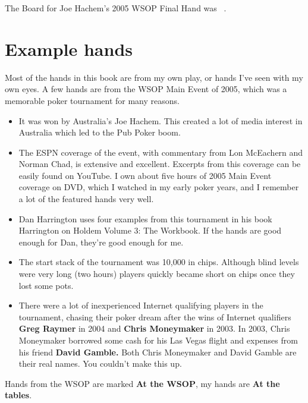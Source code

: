 The Board for Joe Hachem's 2005 WSOP Final Hand was
\sixh\fived\fourd\As\fourc\ .

\section*{Example hands}

Most of the hands in this book are from my own play, or hands I've
seen with my own eyes. A few hands are from the WSOP Main Event
of 2005, which was a memorable poker tournament for many reasons.

\begin{itemize}
  \item It was won by Australia's Joe Hachem. This created a lot of
    media interest in Australia which led to the Pub Poker boom.
  \item The ESPN coverage of the event, with commentary from
    Lon McEachern and Norman Chad, is extensive and
    excellent. Excerpts from this coverage can be easily found on
    YouTube. I own about five hours of 2005 Main Event coverage on
    DVD, which I watched in my early poker years, and I remember a lot
    of the featured hands very well.
  \item Dan Harrington uses four examples from this tournament in his
    book Harrington on Holdem Volume 3: The Workbook. If the hands are
    good enough for Dan, they're good enough for me.
  \item The start stack of the tournament was 10,000 in
    chips. Although blind levels were very long (two hours)
    players quickly became short on chips once they lost some pots.
  \item There were a lot of inexperienced Internet qualifying players
    in the tournament, chasing their poker dream after the wins of
    Internet qualifiers \textbf{Greg Raymer} in 2004 and \textbf{Chris
    Moneymaker} in 2003. In 2003, Chris Moneymaker
    borrowed some cash for his Las Vegas flight and expenses from his
    friend \textbf{David Gamble.} Both Chris Moneymaker and David Gamble are
    their real names. You couldn't make this up.

\end{itemize}

Hands from the WSOP are marked \textbf{At the WSOP}, my hands are
\textbf{At the tables}.


